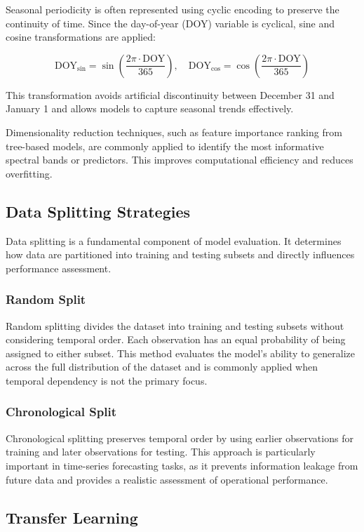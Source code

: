 \documentclass[12pt]{report}
\begin{document}
Seasonal periodicity is often represented using cyclic encoding to preserve the continuity of time. Since the day-of-year (DOY) variable is cyclical, sine and cosine transformations are applied:

\[
\text{DOY}_{\sin} = \sin\left(\frac{2\pi \cdot \text{DOY}}{365}\right),
\quad
\text{DOY}_{\cos} = \cos\left(\frac{2\pi \cdot \text{DOY}}{365}\right)
\]

This transformation avoids artificial discontinuity between December 31 and January 1 and allows models to capture seasonal trends effectively.

Dimensionality reduction techniques, such as feature importance ranking from tree-based models, are commonly applied to identify the most informative spectral bands or predictors. This improves computational efficiency and reduces overfitting.

\subsection{Data Splitting Strategies}

Data splitting is a fundamental component of model evaluation. It determines how data are partitioned into training and testing subsets and directly influences performance assessment.

\subsubsection{Random Split}

Random splitting divides the dataset into training and testing subsets without considering temporal order. Each observation has an equal probability of being assigned to either subset. This method evaluates the model's ability to generalize across the full distribution of the dataset and is commonly applied when temporal dependency is not the primary focus.

\subsubsection{Chronological Split}

Chronological splitting preserves temporal order by using earlier observations for training and later observations for testing. This approach is particularly important in time-series forecasting tasks, as it prevents information leakage from future data and provides a realistic assessment of operational performance.

\subsection{Transfer Learning}
\end{document}
